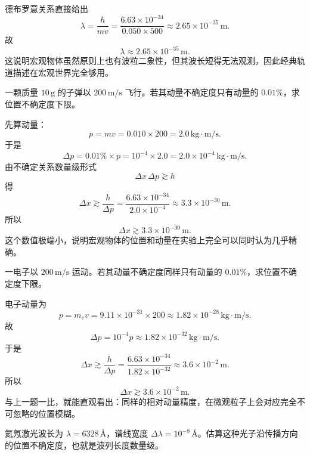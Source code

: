 \documentclass[lang=cn,11pt]{elegantbook}
\begin{document}
\begin{solution}
德布罗意关系直接给出
\[
\lambda=\frac{h}{mv}
=\frac{6.63\times 10^{-34}}{0.050\times 500}
\approx 2.65\times 10^{-35}\,\mathrm{m}.
\]
故
\[
\boxed{\lambda\approx 2.65\times 10^{-35}\,\mathrm{m}.}
\]
这说明宏观物体虽然原则上也有波粒二象性，但其波长短得无法观测，因此经典轨道描述在宏观世界完全够用。
\end{solution}

\begin{example}[子弹动量很精确时位置仍会有多大不确定]
一颗质量 \(10\,\mathrm{g}\) 的子弹以 \(200\,\mathrm{m/s}\) 飞行。若其动量不确定度只有动量的 \(0.01\%\)，求位置不确定度下限。
\end{example}

\begin{solution}
先算动量：
\[
p=mv=0.010\times 200=2.0\,\mathrm{kg\cdot m/s}.
\]
于是
\[
\Delta p=0.01\%\times p=10^{-4}\times 2.0=2.0\times 10^{-4}\,\mathrm{kg\cdot m/s}.
\]
由不确定关系数量级形式
\[
\Delta x\,\Delta p\gtrsim h
\]
得
\[
\Delta x\gtrsim \frac{h}{\Delta p}
=\frac{6.63\times 10^{-34}}{2.0\times 10^{-4}}
\approx 3.3\times 10^{-30}\,\mathrm{m}.
\]
所以
\[
\boxed{\Delta x\gtrsim 3.3\times 10^{-30}\,\mathrm{m}.}
\]
这个数值极端小，说明宏观物体的位置和动量在实验上完全可以同时认为几乎精确。
\end{solution}

\begin{example}[电子在同样相对精度下的位置不确定度]
一电子以 \(200\,\mathrm{m/s}\) 运动。若其动量不确定度同样只有动量的 \(0.01\%\)，求位置不确定度下限。
\end{example}

\begin{solution}
电子动量为
\[
p=m_ev=9.11\times 10^{-31}\times 200
\approx 1.82\times 10^{-28}\,\mathrm{kg\cdot m/s}.
\]
故
\[
\Delta p=10^{-4}p\approx 1.82\times 10^{-32}\,\mathrm{kg\cdot m/s}.
\]
于是
\[
\Delta x\gtrsim \frac{h}{\Delta p}
=\frac{6.63\times 10^{-34}}{1.82\times 10^{-32}}
\approx 3.6\times 10^{-2}\,\mathrm{m}.
\]
所以
\[
\boxed{\Delta x\gtrsim 3.6\times 10^{-2}\,\mathrm{m}.}
\]
与上一题一比，就能直观看出：同样的相对动量精度，在微观粒子上会对应完全不可忽略的位置模糊。
\end{solution}

\begin{example}[由谱线宽度估算光子波列长度]
氦氖激光波长为 \(\lambda=6328\,\text{\AA}\)，谱线宽度 \(\Delta\lambda=10^{-8}\,\text{\AA}\)。估算这种光子沿传播方向的位置不确定度，也就是波列长度数量级。
\end{example}
\end{document}
